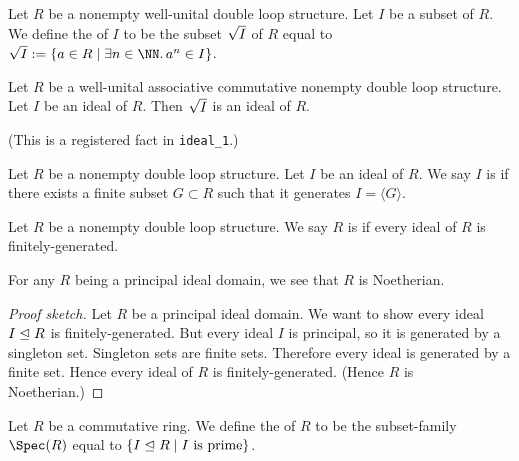 \begin{definition}
Let $R$ be a nonempty well-unital double loop structure.
Let $I$ be a subset of $R$.
We define the  of $I$ to be the subset $\sqrt{I}$
of $R$ equal to $\Radical{I}:=\{a\in R\mid\exists n\in\NN\ldotp a^{n}\in I\}$.
\end{definition}

\begin{theorem}
Let $R$ be a well-unital associative commutative nonempty double loop structure.
Let $I$ be an ideal of $R$.
Then $\sqrt{I}$ is an ideal of $R$.
\end{theorem}

(This is a registered fact in \texttt{ideal\_1}.)

\begin{definition}
Let $R$ be a nonempty double loop structure.
Let $I$ be an ideal of $R$.
We say $I$ is  if there exists a finite
subset $G\subset R$ such that it generates $I=\langle G\rangle$.
\end{definition}

\begin{definition}
Let $R$ be a nonempty double loop structure.
We say $R$ is  if every ideal of $R$ is finitely-generated.
\end{definition}

\begin{theorem}
For any $R$ being a principal ideal domain,
we see that $R$ is Noetherian.
\end{theorem}

\begin{proof}[Proof sketch]
Let $R$ be a principal ideal domain. We want to show every ideal
$I\mathrel{\trianglelefteq} R$ is finitely-generated. But every ideal $I$ is principal,
so it is generated by a singleton set. Singleton sets are finite sets.
Therefore every ideal is generated by a finite set. Hence every ideal
of $R$ is finitely-generated. (Hence $R$ is Noetherian.)
\end{proof}

\begin{definition}
Let $R$ be a commutative ring. We define the  of $R$
to be the subset-family $\Spec(R)$ equal to $\{I\ideal R\mid I\mbox{ is prime}\}$.
\end{definition}

